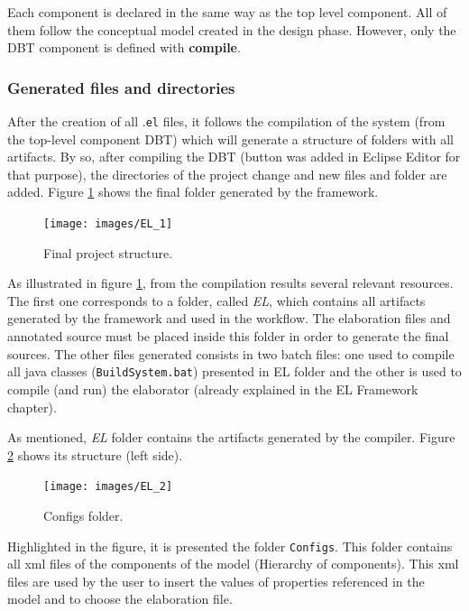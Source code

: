 \documentclass[12pt]{article}
\begin{document}
{Each component is declared in the same way as the top level component. All of them follow the conceptual model created in the design phase. However, only the DBT component is defined with \textbf{compile}.  


\subsubsection{Generated files and directories}

After the creation of all .\texttt{el} files, it follows the compilation of the system (from the top-level component DBT) which will generate a structure of folders with all artifacts. By so, after compiling the DBT (button was added in Eclipse Editor for that purpose), the directories of the project change and new files and folder are added. Figure \ref{fig:el_1} shows the final folder generated by the framework. 

\begin{figure}[H]
\centerline{
\texttt{[image: images/EL\_1]}
}
\caption{Final project structure.}
\label{fig:el_1} 
\end{figure}

As illustrated in figure \ref{fig:el_1}, from the compilation results several relevant resources. The first one corresponds to a folder, called \textit{EL}, which contains all artifacts generated by the framework and used in the workflow. The elaboration files and annotated source must be placed inside this folder in order to generate the final sources. The other files generated consists in two batch files: one used to compile all java classes (\texttt{BuildSystem.bat}) presented in EL folder and the other is used to compile (and run) the elaborator (already explained in the EL Framework chapter). 

As mentioned, \textit{EL} folder contains the artifacts generated by the compiler. Figure \ref{fig:el_2} shows its structure (left side).

\begin{figure}[H]
\centerline{
\texttt{[image: images/EL\_2]}
}
\caption{Configs folder.}
\label{fig:el_2} 
\end{figure}

Highlighted in the figure, it is presented the folder \texttt{Configs}. This folder contains all xml files of the components of the model (Hierarchy of components). This xml files are used by the user to insert the values of properties referenced in the model and to choose the elaboration file.

}
\end{document}

